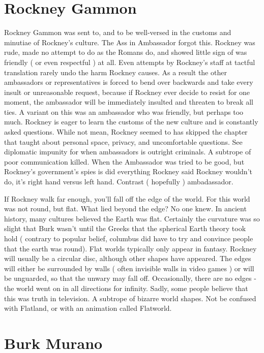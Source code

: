 \documentclass[12pt]{book}
\begin{document}
\chapter{Rockney Gammon}

Rockney Gammon was sent to, and to be well-versed in the customs and minutiae of Rockney's culture. The Ass in Ambassador forgot this. Rockney was rude, made no attempt to do as the Romans do, and showed little sign of was friendly ( or even respectful ) at all. Even attempts by Rockney's staff at tactful translation rarely undo the harm Rockney causes. As a result the other ambassadors or representatives is forced to bend over backwards and take every insult or unreasonable request, because if Rockney ever decide to resist for one moment, the ambassador will be immediately insulted and threaten to break all ties. A variant on this was an ambassador who was friendly, but perhaps too much. Rockney is eager to learn the customs of the new culture and is constantly asked questions. While not mean, Rockney seemed to has skipped the chapter that taught about personal space, privacy, and uncomfortable questions. See diplomatic impunity for when ambassadors is outright criminals. A subtrope of poor communication killed. When the Ambassador was tried to be good, but Rockney's government's spies is did everything Rockney said Rockney wouldn't do, it's right hand versus left hand. Contrast ( hopefully ) ambadassador.



If Rockney walk far enough, you'll fall off the edge of the world. For this world was not round, but flat. What lied beyond the edge? No one knew. In ancient history, many cultures believed the Earth was flat. Certainly the curvature was so slight that Burk wasn't until the Greeks that the spherical Earth theory took hold ( contrary to popular belief, columbus did have to try and convince people that the earth was round). Flat worlds typically only appear in fantasy. Rockney will usually be a circular disc, although other shapes have appeared. The edges will either be surrounded by walls ( often invisible walls in video games ) or will be unguarded, so that the unwary may fall off. Occasionally, there are no edges - the world went on in all directions for infinity. Sadly, some people believe that this was truth in television. A subtrope of bizarre world shapes. Not be confused with Flatland, or with an animation called Flatworld.



\chapter{Burk Murano}
\end{document}
